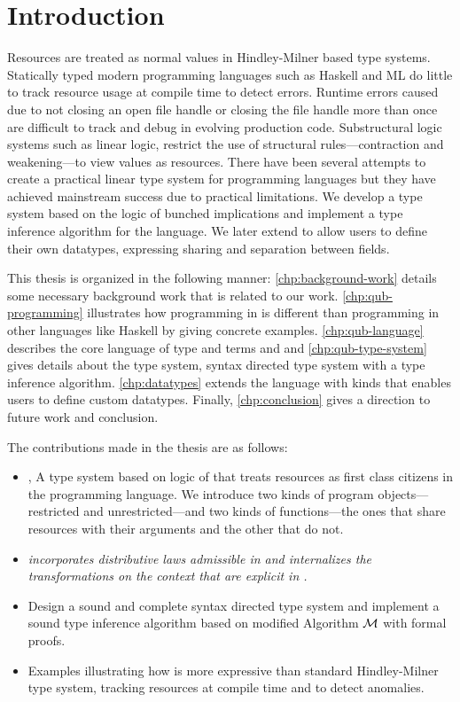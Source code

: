 \chapter{Introduction}\label{chp:intro}

Resources are treated as normal values in Hindley-Milner based type systems. Statically typed modern programming languages such as
Haskell and ML  do little to track resource usage at compile time to detect errors. Runtime errors caused due to not closing an open file handle
or closing the file handle more than once are difficult to track and debug in evolving production code.
Substructural logic systems such as linear logic, restrict the use of structural rules---contraction and weakening---to view values as resources.
There have been several attempts to create a practical linear type system for programming languages but they have achieved mainstream success due to practical
limitations. We develop a type system based on the logic of bunched implications
and implement a type inference algorithm for the language. We later extend to allow users to define
their own datatypes, expressing sharing and separation between fields.

This thesis is organized in the following manner: \cref{chp:background-work} details some necessary background work that is related to our work.
\cref{chp:qub-programming} illustrates how programming in \qub{} is different than programming in other languages like Haskell by giving concrete examples.
\cref{chp:qub-language} describes the core language of type and terms and and \cref{chp:qub-type-system} gives details about the type system,
syntax directed type system with a type inference algorithm. \cref{chp:datatypes} extends the language with kinds that enables users to define
custom datatypes. Finally, \cref{chp:conclusion} gives a direction to future work and conclusion.

The contributions made in the thesis are as follows:
\begin{itemize}
\item \qub{}, A type system based on logic of \BI{} that treats resources as first class citizens in the programming language.
  We introduce two kinds of program objects---restricted and unrestricted---and two kinds of functions---the ones that share resources with
  their arguments and the other that do not.
\item {\em \qub{} incorporates distributive laws admissible in \BI{} and internalizes the transformations on the context that are explicit in \BI{}.}
\item Design a sound and complete syntax directed type system and implement a sound type inference algorithm based on modified Algorithm $\mathcal{M}$ with
  formal proofs.
\item Examples illustrating how \qub{} is more expressive than standard Hindley-Milner type system, tracking resources at compile time and to detect anomalies.
\end{itemize}